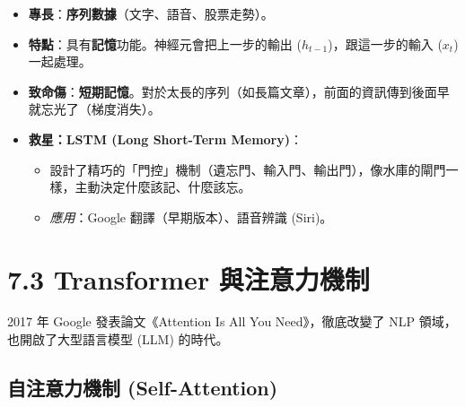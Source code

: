 \documentclass[
  letterpaper,
  DIV=11,
  numbers=noendperiod]{scrreprt}
\providecommand{\tightlist}{%
  \setlength{\itemsep}{0pt}\setlength{\parskip}{0pt}}
\begin{document}
\begin{itemize}
\tightlist
\item
  \textbf{專長}：\textbf{序列數據}（文字、語音、股票走勢）。
\item
  \textbf{特點}：具有\textbf{記憶}功能。神經元會把上一步的輸出
  (\(h_{t-1}\))，跟這一步的輸入 (\(x_t\)) 一起處理。
\item
  \textbf{致命傷}：\textbf{短期記憶}。對於太長的序列（如長篇文章），前面的資訊傳到後面早就忘光了（梯度消失）。
\item
  \textbf{救星：LSTM (Long Short-Term Memory)}：

  \begin{itemize}
  \tightlist
  \item
    設計了精巧的「門控」機制（遺忘門、輸入門、輸出門），像水庫的閘門一樣，主動決定什麼該記、什麼該忘。
  \item
    \emph{應用}：Google 翻譯（早期版本）、語音辨識 (Siri)。
  \end{itemize}
\end{itemize}

\chapter{7.3 Transformer 與注意力機制}\label{sec-transformer}

2017 年 Google 發表論文《Attention Is All You Need》，徹底改變了 NLP
領域，也開啟了大型語言模型 (LLM) 的時代。

\section{自注意力機制 (Self-Attention)}\label{sec-self-attention}
\end{document}
